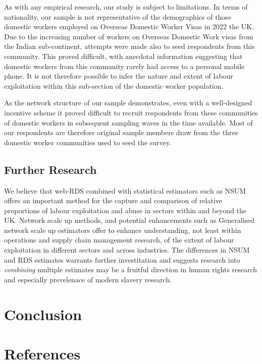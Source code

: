 \documentclass[
  12pt,
  letterpaper,
  DIV=11,
  numbers=noendperiod]{scrartcl}
\theoremstyle{plain}
\theoremstyle{definition}
\begin{document}
As with any empirical research, our study is subject to limitations. In
terms of nationality, our sample is not representative of the
demographics of those domestic workers employed on Overseas Domestic
Worker Visas in 2022 the UK. Due to the increasing number of workers on
Overseas Domestic Work visas from the Indian sub-continent, attempts
were made also to seed respondents from this community. This proved
difficult, with anecdotal information suggesting that domestic workers
from this community rarely had access to a personal mobile phone. It is
not therefore possible to infer the nature and extent of labour
exploitation within this sub-section of the domestic worker population.

As the network structure of our sample demonstrates, even with a
well-designed incentive scheme it proved difficult to recruit
respondents from these communities of domestic workers in subsequent
sampling waves in the time available. Most of our respondents are
therefore original sample members draw from the three domestic worker
communities used to seed the survey.

\subsection{Further Research}\label{further-research}

We believe that web-RDS combined with statistical estimators such as
NSUM offers an important method for the capture and comparison of
relative proportions of labour exploitation and abuse in sectors within
and beyond the UK. Network scale up methods, and potential enhancements
such as Generalised network scale up estimators offer to enhance
understanding, not least within operations and supply chain management
research, of the extent of labour exploitation in different sectors and
across industries. The differences in NSUM and RDS estimates warrants
further investitation and suggests research into \emph{combining}
multiple estimates may be a fruitful direction in human rights research
and especially prevelenace of modern slavery research.

\section{Conclusion}\label{conclusion}

\newpage

\newpage

\section{References}\label{references}
\end{document}
